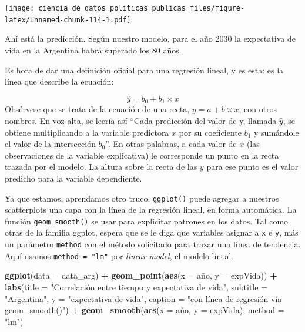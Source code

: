 \documentclass[]{book}
\newenvironment{Shaded}{\begin{snugshade}}{\end{snugshade}}
\newcommand{\KeywordTok}[1]{\textcolor[rgb]{0.13,0.29,0.53}{\textbf{#1}}}
\newcommand{\DataTypeTok}[1]{\textcolor[rgb]{0.13,0.29,0.53}{#1}}
\newcommand{\StringTok}[1]{\textcolor[rgb]{0.31,0.60,0.02}{#1}}
\newcommand{\OperatorTok}[1]{\textcolor[rgb]{0.81,0.36,0.00}{\textbf{#1}}}
\newcommand{\NormalTok}[1]{#1}
\begin{document}
\texttt{[image: ciencia\_de\_datos\_politicas\_publicas\_files/figure-latex/unnamed-chunk-114-1.pdf]}

Ahí está la predicción. Según nuestro modelo, para el año 2030 la
expectativa de vida en la Argentina habrá superado los 80 años.

Es hora de dar una definición oficial para una regresión lineal, y es
esta: es la línea que describe la ecuación:

\[ \hat{y} = b_0 + b_1 \times x \] Obsérvese que se trata de la ecuación
de una recta, \(y = a + b \times x\), con otros nombres. En voz alta, se
leería así ``Cada predicción del valor de y, llamada \(\hat{y}\), se
obtiene multiplicando a la variable predictora \(x\) por su coeficiente
\(b_1\) y sumándole el valor de la intersección \(b_0\)''. En otras
palabras, a cada valor de \(x\) (las observaciones de la variable
explicativa) le corresponde un punto en la recta trazada por el modelo.
La altura sobre la recta de las \(y\) para ese punto es el valor
predicho para la variable dependiente.

Ya que estamos, aprendamos otro truco. \texttt{ggplot()} puede agregar a
nuestros scatterplots una capa con la línea de la regresión lineal, en
forma automática. La función \texttt{geom\_smooth()} se usar para
explicitar patrones en los datos. Tal como otras de la familia ggplot,
espera que se le diga que variables asignar a \texttt{x} e \texttt{y},
más un parámetro \texttt{method} con el método solicitado para trazar
una línea de tendencia. Aquí usamos \texttt{method\ =\ "lm"} por
\emph{linear model}, el modelo lineal.

\begin{Shaded}
\begin{Highlighting}[]
\KeywordTok{ggplot}\NormalTok{(}\DataTypeTok{data =}\NormalTok{ data_arg) }\OperatorTok{+}\StringTok{ }
\StringTok{    }\KeywordTok{geom_point}\NormalTok{(}\KeywordTok{aes}\NormalTok{(}\DataTypeTok{x =}\NormalTok{ año, }\DataTypeTok{y =}\NormalTok{ expVida)) }\OperatorTok{+}
\StringTok{    }\KeywordTok{labs}\NormalTok{(}\DataTypeTok{title =} \StringTok{"Correlación entre tiempo y expectativa de vida"}\NormalTok{,}
         \DataTypeTok{subtitle =} \StringTok{"Argentina"}\NormalTok{,}
         \DataTypeTok{y =} \StringTok{"expectativa de vida"}\NormalTok{,}
         \DataTypeTok{caption =} \StringTok{"con línea de regresión vía geom_smooth()"}\NormalTok{) }\OperatorTok{+}
\StringTok{    }\KeywordTok{geom_smooth}\NormalTok{(}\KeywordTok{aes}\NormalTok{(}\DataTypeTok{x =}\NormalTok{ año, }\DataTypeTok{y =}\NormalTok{ expVida), }\DataTypeTok{method =} \StringTok{"lm"}\NormalTok{)}
\end{Highlighting}
\end{Shaded}
\end{document}

